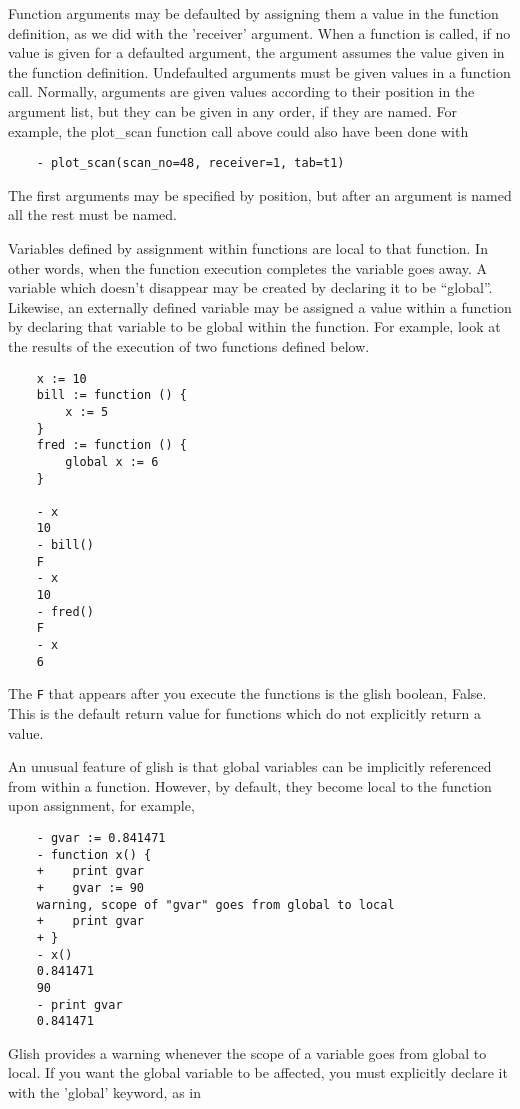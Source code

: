     Function arguments may be defaulted by assigning them a value in the
function definition, as we did with the 'receiver' argument.  When a
function is called, if no value is given for a defaulted argument, the
argument assumes the value given in the function definition.  Undefaulted
arguments must be given values in a function call.  Normally, arguments are
given values according to their position in the argument list, but they can
be given in any order, if they are named.  For example, the plot\_scan
function call above could also have been done with

\begin{verbatim}
	- plot_scan(scan_no=48, receiver=1, tab=t1)
\end{verbatim}

The first arguments may be specified by position, but after an argument is
named all the rest must be named.

    Variables defined by assignment within functions are local to that
function.  In other words, when the function execution completes the
variable goes away.  A variable which doesn't disappear may be created by
declaring it to be ``global''.  Likewise, an externally defined variable may
be assigned a value within a function by declaring that variable to be
global within the function.  For example, look at the results of the
execution of two functions defined below.

\begin{verbatim}
	x := 10
	bill := function () {
	    x := 5
	}
	fred := function () {
	    global x := 6
	}

	- x
	10
	- bill()
	F
	- x
	10
	- fred()
	F
	- x
	6
\end{verbatim}

The \verb!F! that appears after you execute the functions is the glish
boolean, False.  This is the default return value for functions
which do not explicitly return a value.
 
An unusual feature of glish is that global variables can be implicitly
referenced from within a function. However, by default, they become local
to the function upon assignment, for example,

\begin{verbatim}
	- gvar := 0.841471
	- function x() {
	+    print gvar
	+    gvar := 90
	warning, scope of "gvar" goes from global to local
	+    print gvar
	+ }
	- x()   
	0.841471
	90
	- print gvar
	0.841471
\end{verbatim}

Glish provides a warning whenever the scope of a variable goes from global
to local.  If you want the global variable to be affected, you must
explicitly declare it with the 'global' keyword, as in

